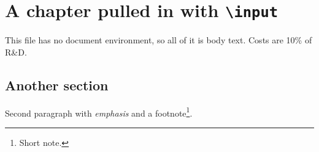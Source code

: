\chapter{A chapter pulled in with \texttt{\textbackslash input}}
This file has no document environment, so all of it is body text. Costs are 10\% of R\&D.

\section{Another section}
Second paragraph with \emph{emphasis} and a footnote\footnote{Short note.}.
